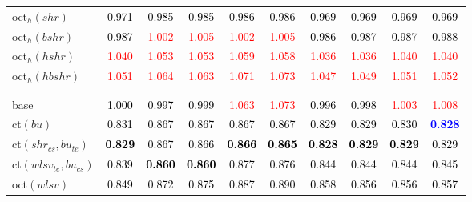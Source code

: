 \begin{tabular}[t]{l|ccccccccc}
oct$_h(shr)$ & \textcolor{black}{0.971} & \textcolor{black}{0.985} & \textcolor{black}{0.985} & \textcolor{black}{0.986} & \textcolor{black}{0.986} & \textcolor{black}{0.969} & \textcolor{black}{0.969} & \textcolor{black}{0.969} & \textcolor{black}{0.969}\\
oct$_h(bshr)$ & \textcolor{black}{0.987} & \textcolor{red}{1.002} & \textcolor{red}{1.005} & \textcolor{red}{1.002} & \textcolor{red}{1.005} & \textcolor{black}{0.986} & \textcolor{black}{0.987} & \textcolor{black}{0.987} & \textcolor{black}{0.988}\\
oct$_h(hshr)$ & \textcolor{red}{1.040} & \textcolor{red}{1.053} & \textcolor{red}{1.053} & \textcolor{red}{1.059} & \textcolor{red}{1.058} & \textcolor{red}{1.036} & \textcolor{red}{1.036} & \textcolor{red}{1.040} & \textcolor{red}{1.040}\\
oct$_h(hbshr)$ & \textcolor{red}{1.051} & \textcolor{red}{1.064} & \textcolor{red}{1.063} & \textcolor{red}{1.071} & \textcolor{red}{1.073} & \textcolor{red}{1.047} & \textcolor{red}{1.049} & \textcolor{red}{1.051} & \textcolor{red}{1.052}\\[-1.5ex]
\hline\\[-1.5ex]
\addlinespace[0.3em]
\multicolumn{10}{c}{\textbf{$k = 2$}}\\
base & \textcolor{black}{1.000} & \textcolor{black}{0.997} & \textcolor{black}{0.999} & \textcolor{red}{1.063} & \textcolor{red}{1.073} & \textcolor{black}{0.996} & \textcolor{black}{0.998} & \textcolor{red}{1.003} & \textcolor{red}{1.008}\\
ct$(bu)$ & \textcolor{black}{0.831} & \textcolor{black}{0.867} & \textcolor{black}{0.867} & \textcolor{black}{0.867} & \textcolor{black}{0.867} & \textcolor{black}{0.829} & \textcolor{black}{0.829} & \textcolor{black}{0.830} & \textcolor{blue}{\textbf{0.828}}\\
ct$(shr_{cs}, bu_{te})$ & \textcolor{black}{\textbf{0.829}} & \textcolor{black}{0.867} & \textcolor{black}{0.866} & \textcolor{black}{\textbf{0.866}} & \textcolor{black}{\textbf{0.865}} & \textcolor{black}{\textbf{0.828}} & \textcolor{black}{\textbf{0.829}} & \textcolor{black}{\textbf{0.829}} & \textcolor{black}{0.829}\\
ct$(wlsv_{te}, bu_{cs})$ & \textcolor{black}{0.839} & \textcolor{black}{\textbf{0.860}} & \textcolor{black}{\textbf{0.860}} & \textcolor{black}{0.877} & \textcolor{black}{0.876} & \textcolor{black}{0.844} & \textcolor{black}{0.844} & \textcolor{black}{0.844} & \textcolor{black}{0.845}\\
oct$(wlsv)$ & \textcolor{black}{0.849} & \textcolor{black}{0.872} & \textcolor{black}{0.875} & \textcolor{black}{0.887} & \textcolor{black}{0.890} & \textcolor{black}{0.858} & \textcolor{black}{0.856} & \textcolor{black}{0.856} & \textcolor{black}{0.857}\\

\end{tabular}
